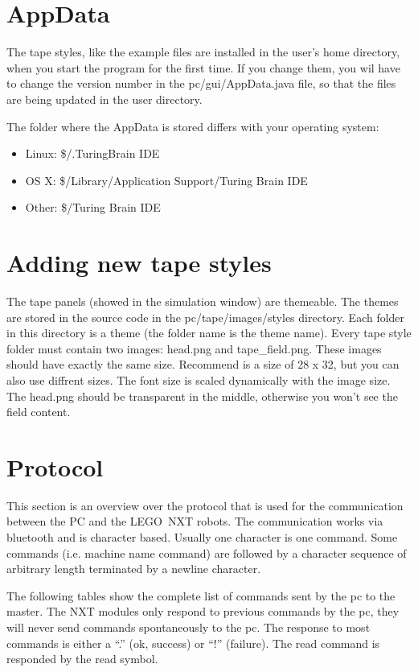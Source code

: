\documentclass[%
  a4paper,%
  11pt,%
  blue,%
  hyperref	%
  ]{tubsartcl}
\begin{document}
\section{AppData}

The tape styles, like the example files are installed in the user's home directory, when you start the program for the first time. If you change them, you wil have to change the version number in the pc/gui/AppData.java file, so that the files are being updated in the user directory.


The folder where the AppData is stored differs with your operating system:

\begin{itemize}
\item Linux: \$/.TuringBrain IDE
\item OS X: \$/Library/Application Support/Turing Brain IDE
\item Other: \$/Turing Brain IDE
\end{itemize}

\section{Adding new tape styles}
\label{sec:adding-new-tape}

The tape panels (showed in the simulation window) are themeable. The themes are stored in the source code in the pc/tape/images/styles directory. Each folder in this directory is a theme (the folder name is the theme name). Every tape style folder must contain two images: head.png and tape\_field.png. These images should have exactly the same size. Recommend is a size of 28 x 32, but you can also use diffrent sizes. The font size is scaled dynamically with the image size. The head.png should be transparent in the middle, otherwise you won't see the field content.

\section{Protocol}

This section is an overview over the protocol that is used for the communication between the PC and the LEGO\textregistered\, NXT robots. The communication works via bluetooth and is character based. Usually one character is one command. Some commands (i.e. machine name command) are followed by a character sequence of arbitrary length terminated by a newline character.

The following tables show the complete list of commands sent by the pc to the master. The NXT modules only respond to previous commands by the pc, they will never send commands spontaneously to the pc. The response to most commands is either a ``.'' (ok, success) or ``!'' (failure). The read command is responded by the read symbol.
\end{document}
